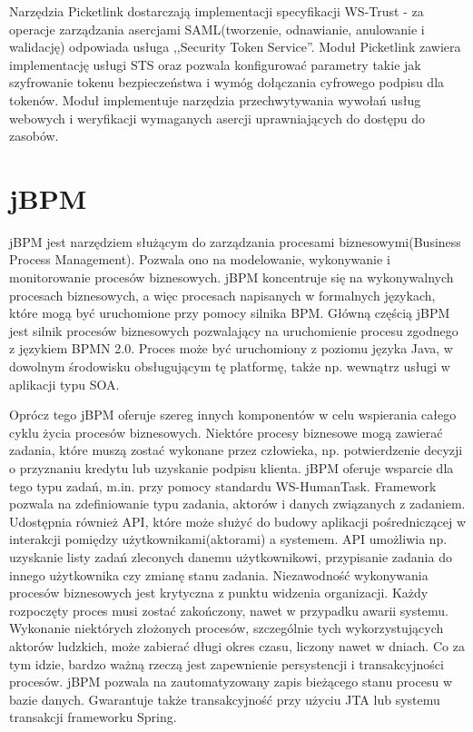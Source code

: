 Narzędzia Picketlink dostarczają implementacji specyfikacji WS-Trust - za operacje zarządzania asercjami SAML(tworzenie, odnawianie, anulowanie i walidację) odpowiada usługa ,,Security Token Service''. Moduł Picketlink zawiera implementację usługi STS oraz pozwala konfigurować parametry takie jak szyfrowanie tokenu bezpieczeństwa i wymóg dołączania cyfrowego podpisu dla tokenów. Moduł implementuje narzędzia przechwytywania wywołań usług webowych i weryfikacji wymaganych asercji uprawniających do dostępu do zasobów. 


\section{jBPM}
\label{sec:bpm}

jBPM jest narzędziem służącym do zarządzania procesami biznesowymi(Business Process Management). Pozwala ono na modelowanie, wykonywanie i monitorowanie procesów biznesowych. jBPM koncentruje się na wykonywalnych procesach biznesowych, a więc procesach napisanych w formalnych językach, które mogą być uruchomione przy pomocy silnika BPM.
Główną częścią jBPM jest silnik procesów biznesowych pozwalający na uruchomienie procesu zgodnego z językiem BPMN 2.0. Proces może być uruchomiony z poziomu języka Java, w dowolnym środowisku obsługującym tę platformę, także np. wewnątrz usługi w aplikacji typu SOA. 

Oprócz tego jBPM oferuje szereg innych komponentów w celu wspierania całego cyklu życia procesów biznesowych. Niektóre procesy biznesowe mogą zawierać zadania, które muszą zostać wykonane przez człowieka, np. potwierdzenie decyzji o przyznaniu kredytu lub uzyskanie podpisu klienta. jBPM oferuje wsparcie dla tego typu zadań, m.in. przy pomocy standardu WS-HumanTask. Framework pozwala na zdefiniowanie typu zadania, aktorów i danych związanych z zadaniem. Udostępnia również API, które może służyć do budowy aplikacji pośredniczącej w interakcji pomiędzy użytkownikami(aktorami) a systemem. API umożliwia np.  uzyskanie listy zadań zleconych danemu użytkownikowi, przypisanie zadania do innego użytkownika czy zmianę stanu zadania.
Niezawodność wykonywania procesów biznesowych jest krytyczna z punktu widzenia organizacji. Każdy rozpoczęty proces musi zostać zakończony, nawet w przypadku awarii systemu. Wykonanie niektórych złożonych procesów, szczególnie tych wykorzystujących aktorów ludzkich,  może zabierać długi okres czasu, liczony nawet w dniach. Co za tym idzie, bardzo ważną rzeczą jest zapewnienie persystencji i transakcyjności procesów. jBPM pozwala na zautomatyzowany zapis bieżącego stanu procesu w bazie danych. Gwarantuje także transakcyjność przy użyciu JTA lub systemu transakcji frameworku Spring.

